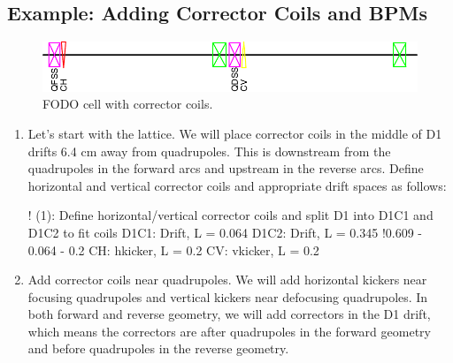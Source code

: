 \documentclass{hitec}     %
\begin{document}
{{{{\subsection{Example: Adding Corrector Coils and BPMs}

\begin{figure}[!h]
  \centering
  \includegraphics[width=0.9\linewidth]{figures/correctors.pdf}
  \caption{FODO cell with corrector coils.}
  \label{f:corrector}
\end{figure}

\begin{enumerate}[leftmargin=*]
\item Let's start with the  lattice. We will place corrector coils in the middle of D1 drifts 6.4 cm away from quadrupoles. This is downstream from the quadrupoles in the forward arcs and upstream in the reverse arcs. Define horizontal and vertical corrector coils and appropriate drift spaces as follows:
\begin{code}
! (1): Define horizontal/vertical corrector coils and 
        split D1 into D1C1 and D1C2 to fit coils
D1C1: Drift, L = 0.064
D1C2: Drift, L = 0.345 !0.609 - 0.064 - 0.2
CH: hkicker, L = 0.2
CV: vkicker, L = 0.2
\end{code}
\item Add corrector coils near quadrupoles. We will add horizontal kickers near focusing quadrupoles and vertical kickers near defocusing quadrupoles. In both forward and reverse geometry, we will add correctors in the D1 drift, which means the correctors are after quadrupoles in the forward geometry and before quadrupoles in the reverse geometry. 


\end{enumerate}}}}}
\end{document}
